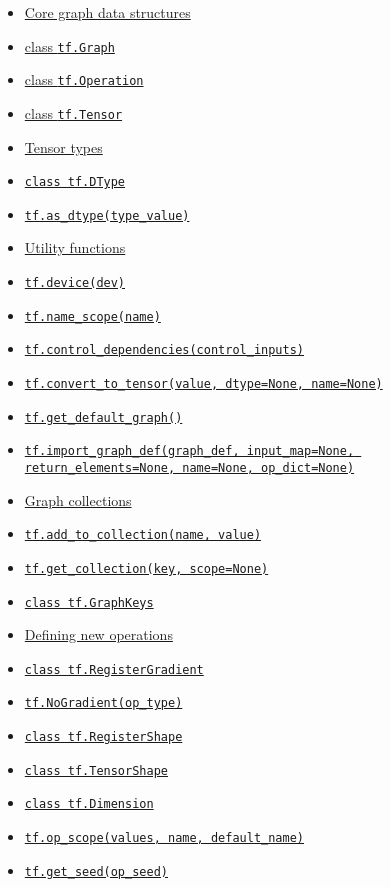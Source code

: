 \begin{itemize}
   \setlength{\parsep}{-5pt}
   \setlength{\itemsep}{-5pt}
\item \hyperref[core-graph-data-structures]{Core graph data structures}
\item \hyperref[class-tf.graph]{class \lstinline{tf.Graph}}
\item \hyperref[class-tf.operation]{class \lstinline{tf.Operation}}
\item \protect\hyperlink{Tensor}{class \lstinline{tf.Tensor}}
\item \protect\hyperlink{AUTOGENERATED-tensor-types}{Tensor types}
\item \protect\hyperlink{DType}{\lstinline{class tf.DType}}
\item \protect\hyperlink{asux5fdtype}{\lstinline{tf.as_dtype(type_value)}}
\item \protect\hyperlink{AUTOGENERATED-utility-functions}{Utility functions}
\item \protect\hyperlink{device}{\lstinline{tf.device(dev)}}
\item \protect\hyperlink{nameux5fscope}{\lstinline{tf.name_scope(name)}}
\item \protect\hyperlink{controlux5fdependencies}{\lstinline{tf.control_dependencies(control_inputs)}}
\item \protect\hyperlink{convertux5ftoux5ftensor}{\lstinline{tf.convert_to_tensor(value, dtype=None, name=None)}}
\item \protect\hyperlink{getux5fdefaultux5fgraph}{\lstinline{tf.get_default_graph()}}
\item \protect\hyperlink{importux5fgraphux5fdef}{\lstinline{tf.import_graph_def(graph_def, input_map=None, return_elements=None, name=None, op_dict=None)}}
\item \protect\hyperlink{AUTOGENERATED-graph-collections}{Graph collections}
\item \protect\hyperlink{addux5ftoux5fcollection}{\lstinline{tf.add_to_collection(name, value)}}
\item \protect\hyperlink{getux5fcollection}{\lstinline{tf.get_collection(key, scope=None)}}
\item \protect\hyperlink{GraphKeys}{\lstinline{class tf.GraphKeys}}
\item \protect\hyperlink{AUTOGENERATED-defining-new-operations}{Defining new
  operations}
\item \protect\hyperlink{RegisterGradient}{\lstinline{class tf.RegisterGradient}}
\item \protect\hyperlink{NoGradient}{\lstinline{tf.NoGradient(op_type)}}
\item \protect\hyperlink{RegisterShape}{\lstinline{class tf.RegisterShape}}
\item \protect\hyperlink{TensorShape}{\lstinline{class tf.TensorShape}}
\item \protect\hyperlink{Dimension}{\lstinline{class tf.Dimension}}
\item \protect\hyperlink{opux5fscope}{\lstinline{tf.op_scope(values, name, default_name)}}
\item \protect\hyperlink{getux5fseed}{\lstinline{tf.get_seed(op_seed)}}
\end{itemize}


